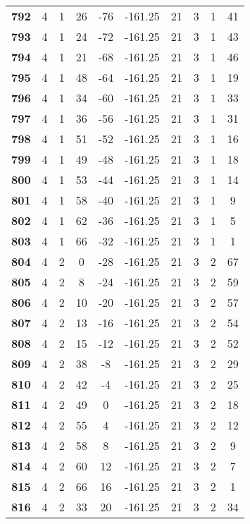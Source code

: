 \documentclass[12pt,letterpaper, onecolumn]{exam}
\begin{document}
\begin{longtable}{cccccccccc}
    \textbf{792} & 4 & 1 & 26 & -76 & -161.25 & 21 & 3 & 1 & 41 \\ 
    \textbf{793} & 4 & 1 & 24 & -72 & -161.25 & 21 & 3 & 1 & 43 \\ 
    \textbf{794} & 4 & 1 & 21 & -68 & -161.25 & 21 & 3 & 1 & 46 \\ 
    \textbf{795} & 4 & 1 & 48 & -64 & -161.25 & 21 & 3 & 1 & 19 \\ 
    \textbf{796} & 4 & 1 & 34 & -60 & -161.25 & 21 & 3 & 1 & 33 \\ 
    \textbf{797} & 4 & 1 & 36 & -56 & -161.25 & 21 & 3 & 1 & 31 \\ 
    \textbf{798} & 4 & 1 & 51 & -52 & -161.25 & 21 & 3 & 1 & 16 \\ 
    \textbf{799} & 4 & 1 & 49 & -48 & -161.25 & 21 & 3 & 1 & 18 \\ 
    \textbf{800} & 4 & 1 & 53 & -44 & -161.25 & 21 & 3 & 1 & 14 \\ 
    \textbf{801} & 4 & 1 & 58 & -40 & -161.25 & 21 & 3 & 1 & 9 \\ 
    \textbf{802} & 4 & 1 & 62 & -36 & -161.25 & 21 & 3 & 1 & 5 \\ 
    \textbf{803} & 4 & 1 & 66 & -32 & -161.25 & 21 & 3 & 1 & 1 \\ 
    \textbf{804} & 4 & 2 & 0 & -28 & -161.25 & 21 & 3 & 2 & 67 \\ 
    \textbf{805} & 4 & 2 & 8 & -24 & -161.25 & 21 & 3 & 2 & 59 \\ 
    \textbf{806} & 4 & 2 & 10 & -20 & -161.25 & 21 & 3 & 2 & 57 \\ 
    \textbf{807} & 4 & 2 & 13 & -16 & -161.25 & 21 & 3 & 2 & 54 \\ 
    \textbf{808} & 4 & 2 & 15 & -12 & -161.25 & 21 & 3 & 2 & 52 \\ 
    \textbf{809} & 4 & 2 & 38 & -8 & -161.25 & 21 & 3 & 2 & 29 \\ 
    \textbf{810} & 4 & 2 & 42 & -4 & -161.25 & 21 & 3 & 2 & 25 \\ 
    \textbf{811} & 4 & 2 & 49 & 0 & -161.25 & 21 & 3 & 2 & 18 \\       \hline
    \textbf{812} & 4 & 2 & 55 & 4 & -161.25 & 21 & 3 & 2 & 12 \\ 
    \textbf{813} & 4 & 2 & 58 & 8 & -161.25 & 21 & 3 & 2 & 9 \\ 
    \textbf{814} & 4 & 2 & 60 & 12 & -161.25 & 21 & 3 & 2 & 7 \\ 
    \textbf{815} & 4 & 2 & 66 & 16 & -161.25 & 21 & 3 & 2 & 1 \\ 
    \textbf{816} & 4 & 2 & 33 & 20 & -161.25 & 21 & 3 & 2 & 34 \\ 

\end{longtable}
\end{document}
